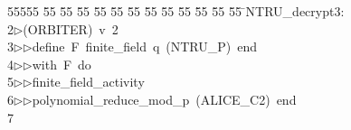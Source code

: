 %
%
\begin{tabbing}
55555 \= 55 \= 55 \= 55 \= 55 \= 55 \= 55 \= 55 \= 55 \= 55 \= 55 \= 55 \= 55 \= \>NTRU\_decrypt3:\\[0pt]
2\>$\triangleright$\>(ORBITER)\ v\ 2\ \\[0pt]
3\>$\triangleright$\>$\triangleright$\>define\ F\ finite\_field\ q\ (NTRU\_P)\ end\ \\[0pt]
4\>$\triangleright$\>$\triangleright$\>with\ F\ do\ \\[0pt]
5\>$\triangleright$\>$\triangleright$\>finite\_field\_activity\ \\[0pt]
6\>$\triangleright$\>$\triangleright$\>polynomial\_reduce\_mod\_p\ (ALICE\_C2)\ end\\[0pt]
7\>\end{tabbing}

